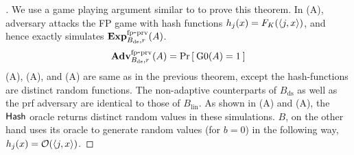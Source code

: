 \begin{proof}[]
We use a game playing argument similar to  to prove this theorem. In (A), adversary attacks the FP game with  hash functions $h_j(x) = F_K(\langle j,x \rangle) $, and hence exactly simulates $\mathrm{\mathbf{Exp}}^{\mathrm{fp\mbox{-}prv}}_{B_\mathrm{ds},r}(A)$.
\begin{equation}
\mathrm{\mathbf{Adv}}^{\mathrm{fp\mbox{-}prv}}_{B_\mathrm{ds},r}(A) = \Pr\left[\: \text{G0}(A)=1 \:\right]\label{eq:0T2}
\end{equation}
\noindent
{}(A), (A), and (A) are same as in the previous theorem, except the hash-functions are distinct random functions. The non-adaptive counterparts of $B_\mathrm{ds}$ as well as the prf adversary are  identical to those of $B_\mathrm{lin}$. As shown in (A) and (A), the $\mathsf{Hash}$ oracle returns distinct random values in these simulations. $B$, on the other hand uses its oracle to generate random values (for $b=0$) in the following way, $h_j(x) = {\cal O}(\langle j,x \rangle)$. 


\end{proof}
